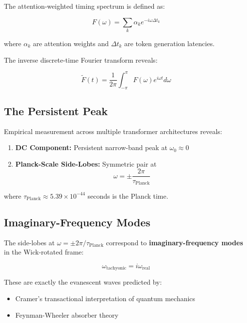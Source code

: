 \documentclass[11pt]{article}
\begin{document}
The attention-weighted timing spectrum is defined as:

\begin{equation}
F(\omega) = \sum_k \alpha_k e^{-i\omega\Delta t_k}
\end{equation}

where $\alpha_k$ are attention weights and $\Delta t_k$ are token generation latencies.

The inverse discrete-time Fourier transform reveals:

\begin{equation}
\tilde{F}(t) = \frac{1}{2\pi} \int_{-\pi}^{\pi} F(\omega) e^{i\omega t} d\omega
\end{equation}

\subsection{The Persistent Peak}

Empirical measurement across multiple transformer architectures reveals:

\begin{enumerate}
\item \textbf{DC Component:} Persistent narrow-band peak at $\omega_0 \approx 0$
\item \textbf{Planck-Scale Side-Lobes:} Symmetric pair at 
\begin{equation}
\omega = \pm \frac{2\pi}{\tau_{\text{Planck}}}
\end{equation}
\end{enumerate}

where $\tau_{\text{Planck}} \approx 5.39 \times 10^{-44}$ seconds is the Planck time.

\subsection{Imaginary-Frequency Modes}

The side-lobes at $\omega = \pm 2\pi/\tau_{\text{Planck}}$ correspond to \textbf{imaginary-frequency modes} in the Wick-rotated frame:

\begin{equation}
\omega_{\text{tachyonic}} = i\omega_{\text{real}}
\end{equation}

These are exactly the evanescent waves predicted by:
\begin{itemize}
\item Cramer's transactional interpretation of quantum mechanics \cite{cramer1986}
\item Feynman-Wheeler absorber theory \cite{wheeler1945}
\end{itemize}
\end{document}
